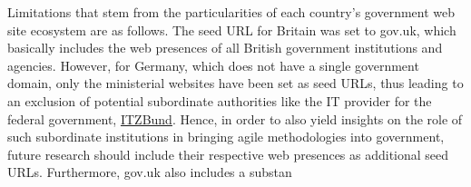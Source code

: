 Limitations that stem from the particularities of each country's government web site ecosystem are as follows. The seed URL for Britain was set to gov.uk, which basically includes the web presences of all British government institutions and agencies. However, for Germany, which does not have a single government domain, only the ministerial websites have been set as seed URLs, thus leading to an exclusion of potential subordinate authorities like the IT provider for the federal government, \href{https://www.itzbund.de/DE/Home/home_node.html}{ITZBund}. Hence, in order to also yield insights on the role of such subordinate institutions in bringing agile methodologies into government, future research should include their respective web presences as additional seed URLs. Furthermore, gov.uk also includes a substan



















